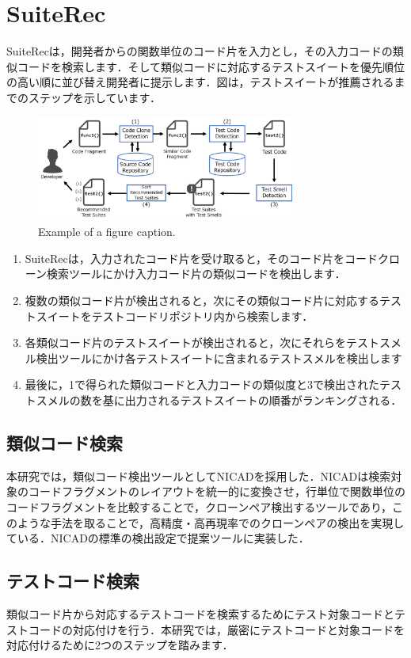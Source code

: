 \documentclass[conference]{IEEEtran}
\begin{document}
\section{SuiteRec}
SuiteRecは，開発者からの関数単位のコード片を入力とし，その入力コードの類似コードを検索します．そして類似コードに対応するテストスイートを優先順位の高い順に並び替え開発者に提示します．図は，テストスイートが推薦されるまでのステップを示しています．

\begin{figure}[htbp]
\centerline{\includegraphics[width=8.5cm]{SuiteRec-OutLine.pdf}}
\caption{Example of a figure caption.}
\label{fig}
\end{figure}

\begin{enumerate}
\renewcommand{\labelenumi}{(\arabic{enumi})}
\item SuiteRecは，入力されたコード片を受け取ると，そのコード片をコードクローン検索ツールにかけ入力コード片の類似コードを検出します．
\item 複数の類似コード片が検出されると，次にその類似コード片に対応するテストスイートをテストコードリポジトリ内から検索します．
\item 各類似コード片のテストスイートが検出されると，次にそれらをテストスメル検出ツールにかけ各テストスイートに含まれるテストスメルを検出します
\item 最後に，1で得られた類似コードと入力コードの類似度と3で検出されたテストスメルの数を基に出力されるテストスイートの順番がランキングされる．
\end{enumerate}


\subsection{類似コード検索}
本研究では，類似コード検出ツールとしてNICADを採用した．NICADは検索対象のコードフラグメントのレイアウトを統一的に変換させ，行単位で関数単位のコードフラグメントを比較することで，クローンペア検出するツールであり，このような手法を取ることで，高精度・高再現率でのクローンペアの検出を実現している．NICADの標準の検出設定で提案ツールに実装した．

\subsection{テストコード検索}
類似コード片から対応するテストコードを検索するためにテスト対象コードとテストコードの対応付けを行う．本研究では，厳密にテストコードと対象コードを対応付けるために2つのステップを踏みます．
\end{document}
